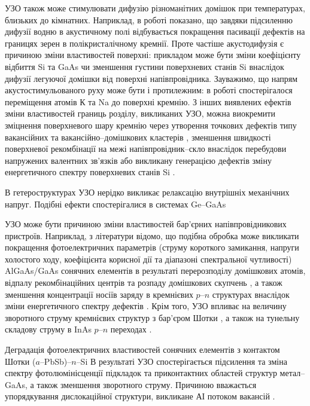 УЗО також може стимулювати дифузію різноманітних домішок при температурах, близьких до кімнатних.
Наприклад, в роботі \cite{Ostapenko1999} показано, що завдяки підсиленню дифузії водню в акустичному полі відбувається покращення пасивації дефектів на границях зерен в полікристалічному кремнії.
Проте частіше акустодифузія є причиною зміни властивостей поверхні:
прикладом може бути зміни коефіцієнту відбиття Si та GaAs \cite{Zaver} чи зменшення густини поверхневих станів Si \cite{Zaver:2008r} внаслідок дифузії легуючої домішки від поверхні напівпровідника.
Зауважимо, що напрям акустостимульованого руху може бути і протилежним:
в роботі \cite{Ostrov2002FTPr} спостерігалося переміщення атомів К та Na до поверхні кремнію.
З інших виявлених ефектів зміни властивостей границь розділу, викликаних УЗО,
можна виокремити зміцнення поверхневого шару кремнію через утворення точкових дефектів типу вакансійних та вакансійно--домішкових кластерів \cite{Ostrov2000FTPr},
зменшення швидкості поверхневої рекомбінації на межі напівпровідник--скло внаслідок перебудови напружених валентних зв'язків \cite{Vlasov2009r} або викликану генерацією дефектів зміну енергетичного спектру поверхневих станів Si \cite{Zaver:2008r}.

В гетероструктурах УЗО нерідко викликає релаксацію внутрішніх механічних напруг.
Подібні ефекти спостерігалися в системах Ge--GaAs \cite{BritunFTT} 


УЗО може бути причиною зміни властивостей бар'єрних напівпровідникових пристроїв.
Наприклад, з літератури відомо, що подібна обробка може викликати покращення фотоелектричних параметрів (струму короткого замикання, напруги холостого ходу, коефіцієнта корисної дії та діапазоні спектральної чутливості) AlGaAs/GaAs сонячних елементів в результаті перерозподілу домішкових атомів, відпалу рекомбінаційних центрів та розпаду домішкових скупчень \cite{Zaver2005}, а також зменшення концентрації носіїв заряду в кремнієвих $p$--$n$ структурах внаслідок зміни енергетичного спектру дефектів \cite{Davletova2008}.
Крім того, УЗО впливає на величину зворотного струму кремнієвих структур з бар'єром Шотки \cite{Tagaev}, а також на тунельну складову струму в InAs $p$--$n$ переходах \cite{Teterkin2009r}.

Деградація фотоелектричних властивостей сонячних елементів з контактом Шотки ($a$--PbSb)--$n$--Si \cite{Pashaev2012r,PashOJA}
В результаті УЗО спостерігається підсилення та зміна спектру фотолюмінісценції підкладок та приконтактних областей структур метал--GaAs, а також зменшення зворотного струму.
Причиною вважається упорядкування дислокаційної структури, викликане АІ потоком вакансій \cite{UST:SDErmol}.


